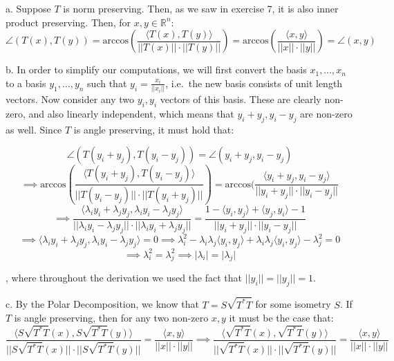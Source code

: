 \begin{solution}
    
    a. Suppose $T$ is norm preserving. Then, as we saw in exercise 7, it is also inner product preserving. Then, for $x, y \in \mathbb{R}^n$:
    $$\angle(T(x), T(y)) = \text{arccos}(\frac{\langle T(x), T(y) \rangle}{\lvert \lvert T(x) \rvert \rvert \cdot \lvert \lvert T(y) \rvert \rvert}) = \text{arccos}(\frac{\langle x, y \rangle}{\lvert \lvert x \rvert \rvert \cdot \lvert \lvert y \rvert \rvert}) = \angle(x, y)$$

    b. In order to simplify our computations, we will first convert the basis $x_1, \ldots, x_n$ to a basis $y_1, \ldots, y_n$ such that $y_i = \frac{x_i}{\lvert \lvert x_i \rvert \rvert}$, i.e.\ the new basis consists of unit length vectors. Now consider any two $y_i, y_i$ vectors of this basis. These are clearly non-zero, and also linearly independent, which means that $y_i+y_j, y_i-y_j$ are non-zero as well. Since $T$ is angle preserving, it must hold that:
    
    $$\angle(T(y_i+y_j), T(y_i-y_j)) = \angle(y_i+y_j, y_i-y_j)$$
    $$\implies \text{arccos}(\frac{\langle T(y_i+y_j), T(y_i-y_j) \rangle}{\lvert \lvert T(y_i-y_j) \rvert \rvert \cdot \lvert \lvert T(y_i+y_j) \rvert \rvert}) = \text{arccos}(\frac{\langle y_i+y_j, y_i-y_j \rangle}{\lvert \lvert y_i+y_j \rvert \rvert \cdot \lvert \lvert y_i-y_j \rvert \rvert}$$
    $$\implies \frac{\langle \lambda_i y_i + \lambda_j y_j, \lambda_i y_i - \lambda_j y_j\rangle}{\lvert \lvert \lambda_i y_i - \lambda_j y_j \rvert \rvert \cdot \lvert \lvert \lambda_i y_i + \lambda_j y_j \rvert \rvert} = \frac{1 - \langle y_i, y_j \rangle + \langle y_j, y_i \rangle - 1}{\lvert \lvert y_i+y_j \rvert \rvert \cdot \lvert \lvert y_i - y_j \rvert \rvert}$$
    $$\implies \langle \lambda_i y_i + \lambda_j y_j, \lambda_i y_i - \lambda_j y_j \rangle = 0 \implies \lambda_i^2 - \lambda_i \lambda_j \langle y_i, y_j \rangle + \lambda_i \lambda_j \langle y_i, y_j \rangle - \lambda_j^2 = 0$$
    $$\implies \lambda_i^2 = \lambda_j^2 \implies \lvert \lambda_i \rvert = \lvert \lambda_j \rvert$$

    , where throughout the derivation we used the fact that $\lvert \lvert y_i \rvert \rvert = \lvert \lvert y_j \rvert \rvert = 1$.

    c. By the Polar Decomposition, we know that $T=S\sqrt{T^*T}$ for some isometry $S$. If $T$ is angle preserving, then for any two non-zero $x, y$ it must be the case that:
    $$\frac{\langle S\sqrt{T^*T}(x), S\sqrt{T^*T}(y) \rangle}{\lvert \lvert S\sqrt{T^*T}(x) \rvert \rvert \cdot \lvert \lvert S\sqrt{T^*T}(y) \rvert \rvert} = \frac{\langle x, y \rangle}{\lvert \lvert x \rvert \rvert \cdot \lvert \lvert y \rvert \rvert} \implies \frac{\langle \sqrt{T^*T}(x), \sqrt{T^*T}(y) \rangle}{\lvert \lvert \sqrt{T^*T}(x) \rvert \rvert \cdot \lvert \lvert \sqrt{T^*T}(y) \rvert \rvert} = \frac{\langle x, y \rangle}{\lvert \lvert x \rvert \rvert \cdot \lvert \lvert y \rvert \rvert}$$


\end{solution}
